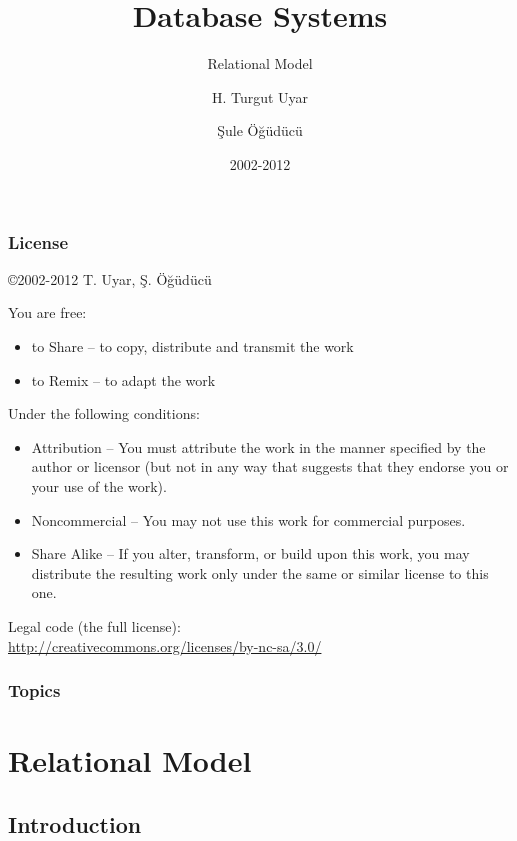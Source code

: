 \documentclass[dvipsnames]{beamer}
\title{Database Systems}
\subtitle{Relational Model}
\author{H. Turgut Uyar \and Şule Öğüdücü}
\date{2002-2012}
\theoremstyle{plain}
\begin{document}
\begin{frame}
  \titlepage
\end{frame}

\begin{frame}
  \frametitle{License}

  \hfill
  \copyright 2002-2012 T. Uyar, Ş. Öğüdücü

  \vfill
  \begin{tiny}
    You are free:
    \begin{itemize}
      \item to Share -- to copy, distribute and transmit the work
      \item to Remix -- to adapt the work
    \end{itemize}

    Under the following conditions:
    \begin{itemize}
      \item Attribution -- You must attribute the work in the manner specified by
        the author or licensor (but not in any way that suggests that they
        endorse you or your use of the work).

      \item Noncommercial -- You may not use this work for commercial purposes.

      \item Share Alike -- If you alter, transform, or build upon this work, you
        may distribute the resulting work only under the same or similar license
        to this one.
    \end{itemize}
  \end{tiny}

  \vfill
  Legal code (the full license):\\
  \url{http://creativecommons.org/licenses/by-nc-sa/3.0/}
\end{frame}

\begin{frame}
  \frametitle{Topics}
  \tableofcontents
\end{frame}

\lstset{language=TutorialD}

\section{Relational Model}

\subsection{Introduction}
\end{document}
